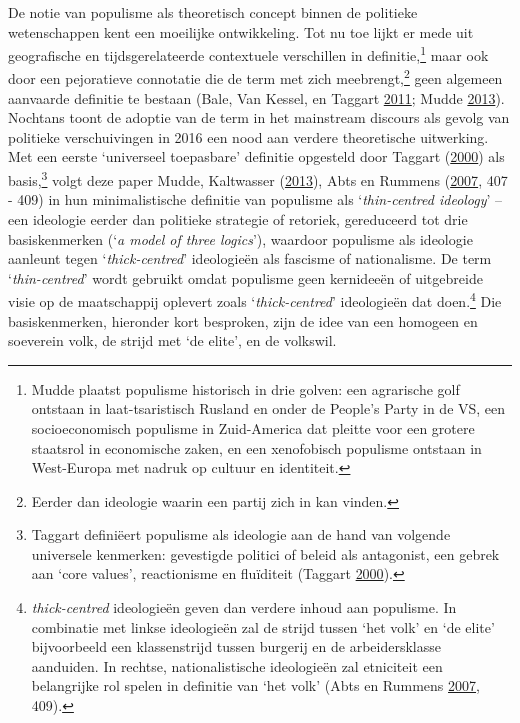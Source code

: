 \documentclass[10.5pt,dutch,]{article}
\begin{document}
De notie van populisme als theoretisch concept binnen de politieke
wetenschappen kent een moeilijke ontwikkeling. Tot nu toe lijkt er mede
uit geografische en tijdsgerelateerde contextuele verschillen in
definitie,\footnote{Mudde plaatst populisme historisch in drie golven:
  een agrarische golf ontstaan in laat-tsaristisch Rusland en onder de
  People's Party in de VS, een socioeconomisch populisme in Zuid-America
  dat pleitte voor een grotere staatsrol in economische zaken, en een
  xenofobisch populisme ontstaan in West-Europa met nadruk op cultuur en
  identiteit.} maar ook door een pejoratieve connotatie die de term met
zich meebrengt,\footnote{Eerder dan ideologie waarin een partij zich in
  kan vinden.} geen algemeen aanvaarde definitie te bestaan (Bale, Van
Kessel, en Taggart \protect\hyperlink{ref-baleux5fthrownux5f2011}{2011};
Mudde \protect\hyperlink{ref-muddeux5foxfordux5f2013}{2013}). Nochtans
toont de adoptie van de term in het mainstream discours als gevolg van
politieke verschuivingen in 2016 een nood aan verdere theoretische
uitwerking. Met een eerste `universeel toepasbare' definitie opgesteld
door Taggart (\protect\hyperlink{ref-taggartux5fpopulismux5f2000}{2000})
als basis,\footnote{Taggart definiëert populisme als ideologie aan de
  hand van volgende universele kenmerken: gevestigde politici of beleid
  als antagonist, een gebrek aan `core values', reactionisme en
  fluïditeit (Taggart
  \protect\hyperlink{ref-taggartux5fpopulismux5f2000}{2000}).} volgt
deze paper Mudde, Kaltwasser
(\protect\hyperlink{ref-muddeux5foxfordux5f2013}{2013}), Abts en Rummens
(\protect\hyperlink{ref-abtsux5fpopulismux5f2007}{2007}, 407 - 409) in
hun minimalistische definitie van populisme als `\emph{thin-centred
ideology}' -- een ideologie eerder dan politieke strategie of retoriek,
gereduceerd tot drie basiskenmerken (`\emph{a model of three logics}'),
waardoor populisme als ideologie aanleunt tegen `\emph{thick-centred}'
ideologieën als fascisme of nationalisme. De term `\emph{thin-centred}'
wordt gebruikt omdat populisme geen kernideeën of uitgebreide visie op
de maatschappij oplevert zoals `\emph{thick-centred}' ideologieën dat
doen.\footnote{\emph{thick-centred} ideologieën geven dan verdere inhoud aan
  populisme. In combinatie met linkse ideologieën zal de strijd tussen
  `het volk' en `de elite' bijvoorbeeld een klassenstrijd tussen
  burgerij en de arbeidersklasse aanduiden. In rechtse, nationalistische
  ideologieën zal etniciteit een belangrijke rol spelen in definitie van
  `het volk' (Abts en Rummens
  \protect\hyperlink{ref-abtsux5fpopulismux5f2007}{2007}, 409).} Die
basiskenmerken, hieronder kort besproken, zijn de idee van een homogeen
en soeverein volk, de strijd met `de elite', en de volkswil.
\end{document}
